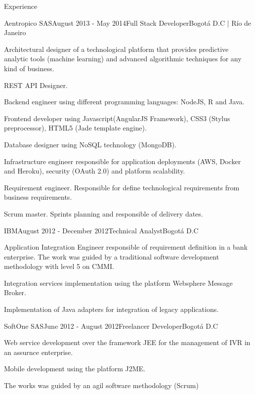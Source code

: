 \documentclass[spanish]{resume}
\begin{document}
\begin{rSection}{Experience}
\begin{rSubsection}{Aentropico SAS}{August 2013 - May 2014}{Full Stack Developer}{Bogot\'a D.C | R\'io de Janeiro}
\item Architectural designer of a technological platform that provides predictive analytic tools (machine learning) and advanced algorithmic techniques for any kind of business.
\item REST API Designer.
\item Backend engineer using different programming languages: NodeJS, R and Java.
\item Frontend developer using Javascript(AngularJS Framework), CSS3 (Stylus preprocessor), HTML5 (Jade template engine).
\item Database designer using NoSQL technology (MongoDB).
\item Infrastructure engineer responsible for application deployments (AWS, Docker and Heroku), security (OAuth 2.0) and platform scalability.
\item Requirement engineer. Responsible for define technological requirements from business requirements.
\item Scrum master. Sprints planning and responsible of delivery dates.
\end{rSubsection}


\begin{rSubsection}{IBM}{August 2012 - December 2012}{Technical Analyst}{Bogot\'a D.C}
\item Application Integration Engineer responsible of requirement definition in a bank enterprise. The work was guided by a traditional software development methodology with level 5 on CMMI.
\item Integration services implementation using the platform Websphere Message Broker.
\item Implementation of Java adapters for integration of legacy applications.
\end{rSubsection}


\begin{rSubsection}{SoftOne SAS}{June 2012 - August 2012}{Freelancer Developer}{Bogot\'a D.C}
\item Web service development over the framework JEE for the management of IVR in an assurnce enterprise.
\item Mobile development using the platform J2ME.
\item The works was guided by an agil software methodology (Scrum)
\end{rSubsection}

\end{rSection}
\end{document}
